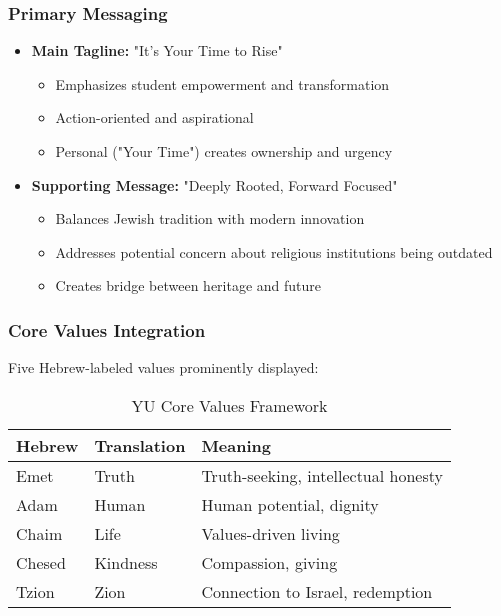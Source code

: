 \documentclass[12pt,letterpaper]{article}
\begin{document}
\subsubsection{Primary Messaging}
\begin{itemize}[leftmargin=*]
    \item \textbf{Main Tagline:} "It's Your Time to Rise"
    \begin{itemize}
        \item Emphasizes student empowerment and transformation
        \item Action-oriented and aspirational
        \item Personal ("Your Time") creates ownership and urgency
    \end{itemize}

    \item \textbf{Supporting Message:} "Deeply Rooted, Forward Focused"
    \begin{itemize}
        \item Balances Jewish tradition with modern innovation
        \item Addresses potential concern about religious institutions being outdated
        \item Creates bridge between heritage and future
    \end{itemize}
\end{itemize}

\subsubsection{Core Values Integration}

Five Hebrew-labeled values prominently displayed:

\begin{table}[h]
\centering
\begin{tabular}{@{}lll@{}}
\toprule
\textbf{Hebrew} & \textbf{Translation} & \textbf{Meaning} \\
\midrule
Emet & Truth & Truth-seeking, intellectual honesty \\
Adam & Human & Human potential, dignity \\
Chaim & Life & Values-driven living \\
Chesed & Kindness & Compassion, giving \\
Tzion & Zion & Connection to Israel, redemption \\
\bottomrule
\end{tabular}
\caption{YU Core Values Framework}
\end{table}
\end{document}
